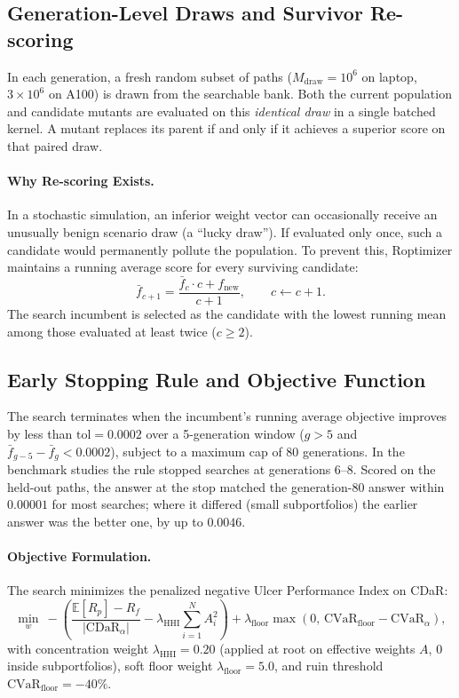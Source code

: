 \documentclass[11pt]{article}
\newcommand{\E}{\mathbb{E}}
\begin{document}
\subsection{Generation-Level Draws and Survivor Re-scoring}
In each generation, a fresh random subset of paths ($M_{\mathrm{draw}} = 10^6$ on laptop, $3\times 10^6$ on A100)
is drawn from the searchable bank. Both the current population and candidate mutants are evaluated on this
\emph{identical draw} in a single batched kernel. A mutant replaces its parent if and only if it achieves a superior
score on that paired draw.

\paragraph{Why Re-scoring Exists.}
In a stochastic simulation, an inferior weight vector can occasionally receive an unusually benign scenario draw
(a ``lucky draw''). If evaluated only once, such a candidate would permanently pollute the population.
To prevent this, Roptimizer maintains a running average score for every surviving candidate:
\begin{equation}
\bar{f}_{c+1} = \frac{\bar{f}_c \cdot c + f_{\mathrm{new}}}{c + 1}, \qquad c \leftarrow c + 1.
\end{equation}
The search incumbent is selected as the candidate with the lowest running mean among those evaluated at least
twice ($c \ge 2$).

\subsection{Early Stopping Rule and Objective Function}
The search terminates when the incumbent's running average objective improves by less than $\mathrm{tol} = 0.0002$
over a 5-generation window ($g > 5$ and $\bar{f}_{g-5} - \bar{f}_g < 0.0002$), subject to a maximum cap of 80 generations.
In the benchmark studies the rule stopped searches at generations 6--8. Scored on the held-out paths, the
answer at the stop matched the generation-80 answer within $0.00001$ for most searches; where it differed
(small subportfolios) the earlier answer was the better one, by up to $0.0046$.

\paragraph{Objective Formulation.}
The search minimizes the penalized negative Ulcer Performance Index on CDaR:
\begin{equation}
\min_w\ -\left(\frac{\E[R_p] - R_f}{|\mathrm{CDaR}_\alpha|} - \lambda_{\mathrm{HHI}}\sum_{i=1}^N A_i^2\right)
+ \lambda_{\mathrm{floor}} \max(0,\, \mathrm{CVaR}_{\mathrm{floor}} - \mathrm{CVaR}_\alpha),
\end{equation}
with concentration weight $\lambda_{\mathrm{HHI}} = 0.20$ (applied at root on effective weights $A$, 0 inside
subportfolios), soft floor weight $\lambda_{\mathrm{floor}} = 5.0$, and ruin threshold $\mathrm{CVaR}_{\mathrm{floor}} = -40\%$.
\end{document}
